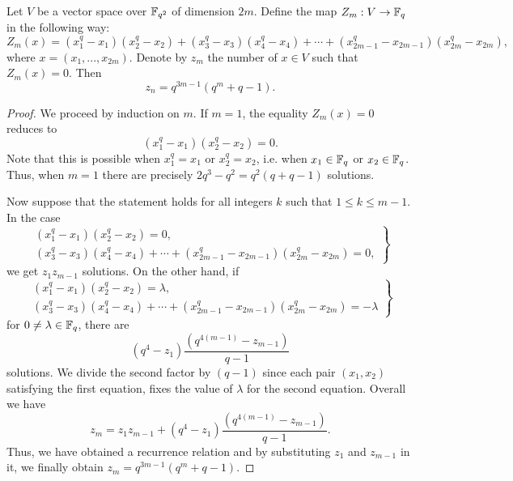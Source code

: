 \begin{lemma}
		\label{lemma:zn}
		Let $V$ be a vector space over $\mathbb{F}_{q^2}$ of dimension $2m$. 
		Define the map \mbox{$Z_m: V \rightarrow \mathbb{F}_q$} 
		in the following way:
		\begin{equation*}
			Z_m(x) = (x_1^q - x_1) (x_2^q - x_2) + (x_3^q - x_3) (x_4^q - x_4) + \cdots +
			(x_{2m-1}^q-x_{2m-1}) (x_{2m}^q - x_{2m}),
		\end{equation*}
		where $x = (x_1, ..., x_{2m})$. 
		Denote by $z_m$ the number of $x\in V$ such that $Z_m(x) = 0$. Then
		\begin{equation*}
			z_n = q^{3m-1}(q^m+q-1).
		\end{equation*}
\end{lemma}

\begin{proof}
		We proceed by induction on $m$. If $m=1$, the equality $Z_m(x)=0$ reduces to
		\begin{equation*}
			(x_1^q - x_1) (x_2^q - x_2) = 0.
		\end{equation*}
		Note that this is possible when $x_1^q = x_1$ or $x_2^q = x_2$, i.e. when
		$x_1 \in \mathbb{F}_q$ or $x_2 \in \mathbb{F}_q$. Thus, when $m=1$ there are precisely
		$2q^3-q^2 = q^2(q+q-1)$ solutions.

		Now suppose that the statement holds for all integers $k$ such that
		$1 \leqslant k \leqslant m-1$. In the case
		\begin{equation*}
			\left.
			\begin{array}{l}
				(x_1^q - x_1) (x_2^q - x_2) = 0, \\
				(x_3^q - x_3) (x_4^q - x_4) + \cdots + 
					(x_{2m-1}^q-x_{2m-1}) (x_{2m}^q - x_{2m}) = 0,
			\end{array}
			\right\}
		\end{equation*}
		we get $z_1 z_{m-1}$ solutions. On the other hand, if
		\begin{equation*}
			\left.
			\begin{array}{l}
				(x_1^q - x_1) (x_2^q - x_2) = \lambda, \\
				(x_3^q - x_3) (x_4^q - x_4) + \cdots + (x_{2m-1}^q-x_{2m-1})
						(x_{2m}^q - x_{2m}) = -\lambda
			\end{array}
			\right\}
		\end{equation*}
		for $0\neq \lambda \in \mathbb{F}_q$, there are 
		\begin{equation*}
			(q^4-z_1) \frac{(q^{4(m-1)}-z_{m-1})}{q-1}
		\end{equation*}
		solutions.
		We divide the second factor by $(q-1)$ since each pair $(x_1,x_2)$ satisfying the
		first equation, fixes the value of $\lambda$ for the second equation. Overall we have
		\begin{equation*}
			z_m = z_1 z_{m-1} + (q^4-z_1) \frac{(q^{4(m-1)}-z_{m-1})}{q-1}.
		\end{equation*}
		Thus, we have obtained a recurrence relation and by substituting $z_1$ and $z_{m-1}$ in
		it, we finally obtain $z_m = q^{3m-1}(q^m+q-1)$.
\end{proof}

